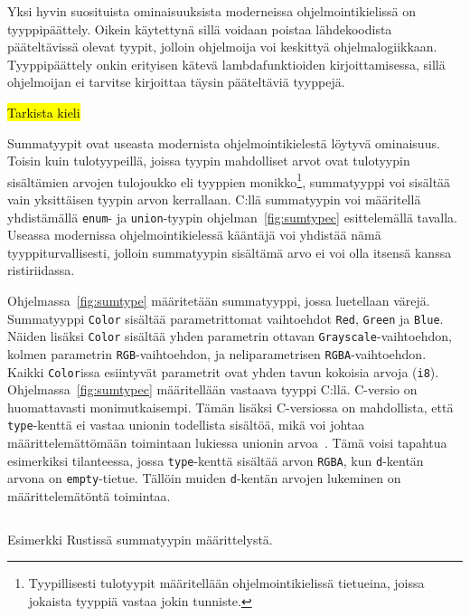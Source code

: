 Yksi hyvin suosituista ominaisuuksista moderneissa ohjelmointikielissä on
tyyppipäättely. Oikein käytettynä sillä voidaan poistaa lähdekoodista
pääteltävissä olevat tyypit, jolloin ohjelmoija voi keskittyä
ohjelmalogiikkaan. Tyyppipäättely onkin erityisen kätevä lambdafunktioiden
kirjoittamisessa, sillä ohjelmoijan ei tarvitse kirjoittaa täysin pääteltäviä
tyyppejä.

\hl{Tarkista kieli}

Summatyypit ovat useasta modernista
ohjelmointikielestä löytyvä ominaisuus. Toisin kuin
tulotyypeillä, joissa tyypin mahdolliset arvot ovat
tulotyypin sisältämien arvojen tulojoukko eli tyyppien
monikko\footnote{Tyypillisesti tulotyypit määritellään ohjelmointikielissä
tietueina, joissa jokaista tyyppiä vastaa jokin tunniste.},
summatyyppi voi sisältää vain yksittäisen tyypin arvon kerrallaan. C:llä
summatyypin voi määritellä yhdistämällä \texttt{enum}- ja \texttt{union}-tyypin
ohjelman~\ref{fig:sumtypec} esittelemällä tavalla. Useassa modernissa
ohjelmointikielessä kääntäjä voi yhdistää nämä tyyppiturvallisesti, jolloin
summatyypin sisältämä arvo ei voi olla itsensä kanssa ristiriidassa.

Ohjelmassa~\ref{fig:sumtype} määritetään summatyyppi, jossa luetellaan värejä.
Summatyyppi \texttt{Color} sisältää parametrittomat vaihtoehdot \texttt{Red},
\texttt{Green} ja \texttt{Blue}. Näiden lisäksi \texttt{Color} sisältää yhden
parametrin ottavan \texttt{Grayscale}-vaihtoehdon, kolmen parametrin
\texttt{RGB}-vaihtoehdon, ja neliparametrisen \texttt{RGBA}-vaihtoehdon. Kaikki
\texttt{Color}issa esiintyvät parametrit ovat yhden tavun kokoisia arvoja
(\texttt{i8}). Ohjelmassa~\ref{fig:sumtypec} määritellään vastaava tyyppi
C:llä. C-versio on huomattavasti monimutkaisempi. Tämän lisäksi C-versiossa on
mahdollista, että \texttt{type}-kenttä ei vastaa unionin todellista sisältöä,
mikä voi johtaa määrittelemättömään toimintaan lukiessa unionin
arvoa~\citep[luku 6.7.2.1]{C18}. Tämä voisi tapahtua esimerkiksi tilanteessa,
jossa \texttt{type}-kenttä sisältää arvon \texttt{RGBA}, kun \texttt{d}-kentän
arvona on \texttt{empty}-tietue. Tällöin muiden \texttt{d}-kentän arvojen
lukeminen on määrittelemätöntä toimintaa.

\FloatBarrier

\begin{listing}[ht!]
    \inputminted{Rust}{sumtype.rs}
    \caption{Esimerkki Rustissä summatyypin määrittelystä.}
    \label{fig:sumtype}
\end{listing}

